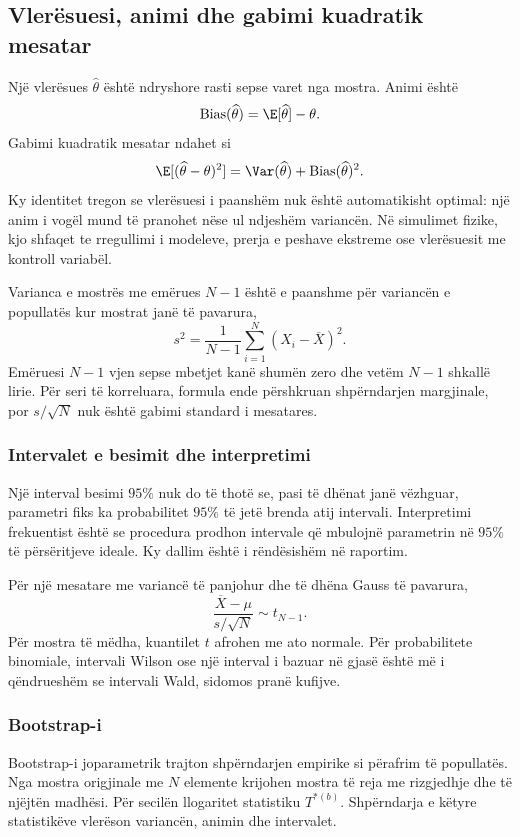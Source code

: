 \subsection{Vlerësuesi, animi dhe gabimi kuadratik mesatar}
Një vlerësues $\widehat\theta$ është ndryshore rasti sepse varet nga mostra. Animi është
\begin{equation}
 \operatorname{Bias}(\widehat\theta)=\E[\widehat\theta]-\theta.
\end{equation}
Gabimi kuadratik mesatar ndahet si
\begin{equation}
 \E[(\widehat\theta-\theta)^2]
 =\Var(\widehat\theta)+\operatorname{Bias}(\widehat\theta)^2.
\end{equation}
Ky identitet tregon se vlerësuesi i paanshëm nuk është automatikisht optimal: një anim i vogël mund të pranohet nëse ul ndjeshëm variancën. Në simulimet fizike, kjo shfaqet te rregullimi i modeleve, prerja e peshave ekstreme ose vlerësuesit me kontroll variabël.

Varianca e mostrës me emërues $N-1$ është e paanshme për variancën e popullatës kur mostrat janë të pavarura,
\begin{equation}
 s^2=\frac{1}{N-1}\sum_{i=1}^{N}(X_i-\overline X)^2.
\end{equation}
Emëruesi $N-1$ vjen sepse mbetjet kanë shumën zero dhe vetëm $N-1$ shkallë lirie. Për seri të korreluara, formula ende përshkruan shpërndarjen margjinale, por $s/\sqrt N$ nuk është gabimi standard i mesatares.

\subsubsection{Intervalet e besimit dhe interpretimi}
Një interval besimi $95\%$ nuk do të thotë se, pasi të dhënat janë vëzhguar, parametri fiks ka probabilitet $95\%$ të jetë brenda atij intervali. Interpretimi frekuentist është se procedura prodhon intervale që mbulojnë parametrin në $95\%$ të përsëritjeve ideale. Ky dallim është i rëndësishëm në raportim.

Për një mesatare me variancë të panjohur dhe të dhëna Gauss të pavarura,
\begin{equation}
 \frac{\overline X-\mu}{s/\sqrt N}\sim t_{N-1}.
\end{equation}
Për mostra të mëdha, kuantilet $t$ afrohen me ato normale. Për probabilitete binomiale, intervali Wilson ose një interval i bazuar në gjasë është më i qëndrueshëm se intervali Wald, sidomos pranë kufijve.

\subsubsection{Bootstrap-i}
Bootstrap-i joparametrik trajton shpërndarjen empirike si përafrim të popullatës. Nga mostra origjinale me $N$ elemente krijohen mostra të reja me rizgjedhje dhe të njëjtën madhësi. Për secilën llogaritet statistiku $T^{*(b)}$. Shpërndarja e këtyre statistikëve vlerëson variancën, animin dhe intervalet.

